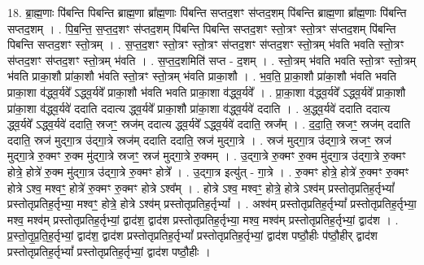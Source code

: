 \documentclass[17pt]{extarticle}
\begin{document}
18. ब्रा॒ह्म॒णाः पि॑बन्ति पिबन्ति ब्राह्म॒णा ब्रा᳚ह्म॒णाः पि॑बन्ति सप्तद॒शꣳ स॑प्तद॒शम् पि॑बन्ति ब्राह्म॒णा ब्रा᳚ह्म॒णाः पि॑बन्ति सप्तद॒शम् । . पि॒ब॒न्ति॒ स॒प्त॒द॒शꣳ स॑प्तद॒शम् पि॑बन्ति पिबन्ति सप्तद॒शꣳ स्तो॒त्रꣳ स्तो॒त्रꣳ स॑प्तद॒शम् पि॑बन्ति पिबन्ति सप्तद॒शꣳ स्तो॒त्रम् । . स॒प्त॒द॒शꣳ स्तो॒त्रꣳ स्तो॒त्रꣳ स॑प्तद॒शꣳ स॑प्तद॒शꣳ स्तो॒त्रम् भ॑वति भवति स्तो॒त्रꣳ स॑प्तद॒शꣳ स॑प्तद॒शꣳ स्तो॒त्रम् भ॑वति । . स॒प्त॒द॒शमिति॑ सप्त - द॒शम् । . स्तो॒त्रम् भ॑वति भवति स्तो॒त्रꣳ स्तो॒त्रम् भ॑वति प्राका॒शौ प्रा॑का॒शौ भ॑वति स्तो॒त्रꣳ स्तो॒त्रम् भ॑वति प्राका॒शौ । . भ॒व॒ति॒ प्रा॒का॒शौ प्रा॑का॒शौ भ॑वति भवति प्राका॒शा व॑द्ध्व॒र्यवे᳚ ऽद्ध्व॒र्यवे᳚ प्राका॒शौ भ॑वति भवति प्राका॒शा व॑द्ध्व॒र्यवे᳚ । . प्रा॒का॒शा व॑द्ध्व॒र्यवे᳚ ऽद्ध्व॒र्यवे᳚ प्राका॒शौ प्रा॑का॒शा व॑द्ध्व॒र्यवे॑ ददाति ददात्य द्ध्व॒र्यवे᳚ प्राका॒शौ प्रा॑का॒शा व॑द्ध्व॒र्यवे॑ ददाति । . अ॒द्ध्व॒र्यवे॑ ददाति ददात्य द्ध्व॒र्यवे᳚ ऽद्ध्व॒र्यवे॑ ददाति॒ स्रजꣳ॒॒ स्रज॑म् ददात्य द्ध्व॒र्यवे᳚ ऽद्ध्व॒र्यवे॑ ददाति॒ स्रज᳚म् । . द॒दा॒ति॒ स्रजꣳ॒॒ स्रज॑म् ददाति ददाति॒ स्रज॑ मुद्गा॒त्र उ॑द्गा॒त्रे स्रज॑म् ददाति ददाति॒ स्रज॑ मुद्गा॒त्रे । . स्रज॑ मुद्गा॒त्र उ॑द्गा॒त्रे स्रजꣳ॒॒ स्रज॑ मुद्गा॒त्रे रु॒क्मꣳ रु॒क्म मु॑द्गा॒त्रे स्रजꣳ॒॒ स्रज॑ मुद्गा॒त्रे रु॒क्मम् । . उ॒द्गा॒त्रे रु॒क्मꣳ रु॒क्म मु॑द्गा॒त्र उ॑द्गा॒त्रे रु॒क्मꣳ होत्रे॒ होत्रे॑ रु॒क्म मु॑द्गा॒त्र उ॑द्गा॒त्रे रु॒क्मꣳ होत्रे᳚ । . उ॒द्गा॒त्र इत्यु॑त् - गा॒त्रे । . रु॒क्मꣳ होत्रे॒ होत्रे॑ रु॒क्मꣳ रु॒क्मꣳ होत्रे ऽश्व॒ मश्वꣳ॒॒ होत्रे॑ रु॒क्मꣳ रु॒क्मꣳ होत्रे ऽश्व᳚म् । . होत्रे ऽश्व॒ मश्वꣳ॒॒ होत्रे॒ होत्रे ऽश्व॑म् प्रस्तोतृप्रतिह॒र्तृभ्यां᳚ प्रस्तोतृप्रतिह॒र्तृभ्या॒ मश्वꣳ॒॒ होत्रे॒ होत्रे ऽश्व॑म् प्रस्तोतृप्रतिह॒र्तृभ्यां᳚ । . अश्व॑म् प्रस्तोतृप्रतिह॒र्तृभ्यां᳚ प्रस्तोतृप्रतिह॒र्तृभ्या॒ मश्व॒ मश्व॑म् प्रस्तोतृप्रतिह॒र्तृभ्यां॒ द्वाद॑श॒ द्वाद॑श प्रस्तोतृप्रतिह॒र्तृभ्या॒ मश्व॒ मश्व॑म् प्रस्तोतृप्रतिह॒र्तृभ्यां॒ द्वाद॑श । . प्र॒स्तो॒तृ॒प्र॒ति॒ह॒र्तृभ्यां॒ द्वाद॑श॒ द्वाद॑श प्रस्तोतृप्रतिह॒र्तृभ्यां᳚ प्रस्तोतृप्रतिह॒र्तृभ्यां॒ द्वाद॑श पष्ठौ॒हीः प॑ष्ठौ॒हीर् द्वाद॑श प्रस्तोतृप्रतिह॒र्तृभ्यां᳚ प्रस्तोतृप्रतिह॒र्तृभ्यां॒ द्वाद॑श पष्ठौ॒हीः । \newline
\end{document}
